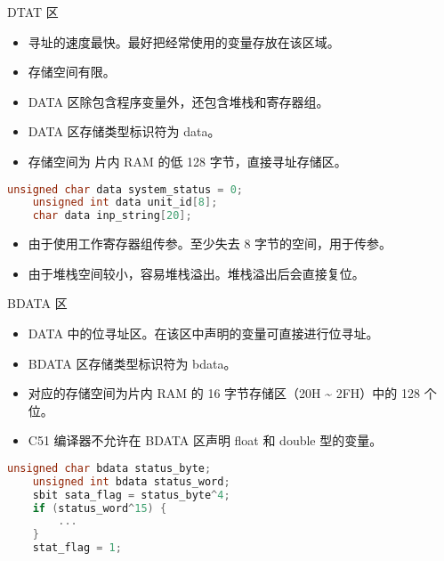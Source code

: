 \documentclass{beamer}
\begin{document}
\begin{frame}[fragile]{DTAT 区}
    \begin{itemize}
        \item
            寻址的速度最快。最好把经常使用的变量存放在该区域。
        \item
            存储空间有限。
        \item
            DATA 区除包含程序变量外，还包含堆栈和寄存器组。
        \item
            DATA 区存储类型标识符为 data。
        \item
            存储空间为 片内 RAM 的低 128 字节，直接寻址存储区。
    \end{itemize}

    \begin{lstlisting}[language=C]
    unsigned char data system_status = 0;
    unsigned int data unit_id[8];
    char data inp_string[20];
    \end{lstlisting}

    \begin{itemize}
        \item
            由于使用工作寄存器组传参。至少失去 8 字节的空间，用于传参。
        \item
            由于堆栈空间较小，容易堆栈溢出。堆栈溢出后会直接复位。
    \end{itemize}
\end{frame}

\begin{frame}[fragile]{BDATA 区}
    \begin{itemize}
        \item
            DATA 中的位寻址区。在该区中声明的变量可直接进行位寻址。
        \item
            BDATA 区存储类型标识符为 bdata。
        \item
            对应的存储空间为片内 RAM 的 16 字节存储区（20H \textasciitilde{}
            2FH）中的 128 个位。
        \item
            C51 编译器不允许在 BDATA 区声明 float 和 double 型的变量。
    \end{itemize}

    \begin{lstlisting}[language=C]
    unsigned char bdata status_byte;
    unsigned int bdata status_word;
    sbit sata_flag = status_byte^4;
    if (status_word^15) {
        ...
    }
    stat_flag = 1;
    \end{lstlisting}
\end{frame}
\end{document}
